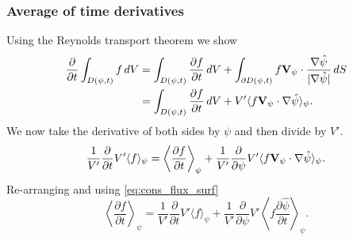 \documentclass[11pt]{article}
\begin{document}
\subsubsection{Average of time derivatives}
Using the Reynolds transport theorem we show
\begin{align}
    \frac{\partial}{\partial t} \int_{D(\psi,t)} f \,dV &= \int_{D(\psi,t)} \frac{\partial f}{\partial t} \, dV + \int_{\partial D(\psi,t)} f \mathbf{V}_\psi \cdot \frac{\nabla \hat{\psi}}{|\nabla \hat{\psi}|} \,dS \nonumber \\
    &= \int_{D(\psi,t)} \frac{\partial f}{\partial t} \, dV + V' \langle f \mathbf{V}_\psi \cdot \nabla \hat{\psi} \rangle_\psi.
\end{align}
We now take the derivative of both sides by $\psi$ and then divide by $V'$.
\begin{equation}
    \frac{1}{V'} \frac{\partial}{\partial t} V' \langle f \rangle_\psi = \left < \frac{\partial f}{\partial t} \right>_\psi + \frac{1}{V'} \frac{\partial}{\partial \psi} V' \langle f \mathbf{V}_\psi \cdot \nabla \hat{\psi} \rangle_\psi.
\end{equation}
Re-arranging and using \cref{eq:cons_flux_surf}
\begin{equation}
    \left < \frac{\partial f}{\partial t} \right >_\psi = \frac{1}{V'} \frac{\partial}{\partial t} V' \langle f \rangle_\psi + \frac{1}{V'} \frac{\partial}{\partial \psi} V' \left < f \frac{\partial \hat{\psi}}{\partial t} \right >_\psi.
\end{equation}
\end{document}
